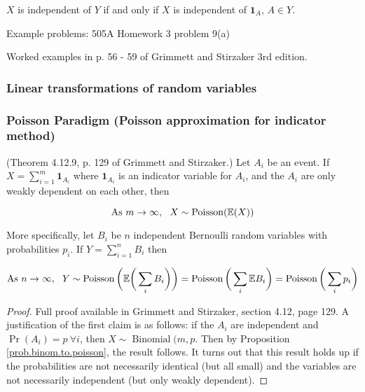 \begin{theorem} \(X\) is independent of \(Y\) if and only if \(X\) is independent of \(\boldsymbol{1}_A\), \(A \in Y\). \end{theorem}

Example problems: 505A Homework 3 problem 9(a)

Worked examples in p. 56 - 59 of Grimmett and Stirzaker 3rd edition.

\subsubsection{Linear transformations of random variables}

\subsubsection{Poisson Paradigm (Poisson approximation for indicator method)}\label{prob.poisson.paradigm}

\begin{theorem} (Theorem 4.12.9, p. 129 of Grimmett and Stirzaker.) Let \(A_i\) be an event. If \(X = \sum_{i=1}^m \boldsymbol{1}_{A_i}\) where \(\boldsymbol{1}_{A_i}\) is an indicator variable for \(A_i\), and the \(A_i\) are only weakly dependent on each other, then 

\[
\text{As } m \to \infty, \ \ X \sim \operatorname{Poisson}(\E(X))
\]

More specifically, let \(B_i\) be \(n\) independent Bernoulli random variables with probabilities \(p_i\). If \(Y = \sum_{i=1}^n B_i\) then 

\[
\text{As } n \to \infty, \ \ Y \sim \operatorname{Poisson} \bigg(\E \bigg(\sum_i B_i \bigg) \bigg) = \operatorname{Poisson}\bigg(\sum_i \E B_i \bigg) = \operatorname{Poisson}\bigg(\sum_i p_i \bigg) 
\]

\end{theorem}

\begin{proof}
Full proof available in Grimmett and Stirzaker, section 4.12, page 129. A justification of the first claim is as follows: if the \(A_i\) are independent and \(\Pr(A_i) = p \ \forall i\), then \(X \sim \operatorname{Binomial}(m, p\). Then by Proposition \ref{prob.binom.to.poisson}, the result follows. It turns out that this result holds up if the probabilities are not necessarily identical (but all small) and the variables are not necessarily independent (but only weakly dependent).
\end{proof}

